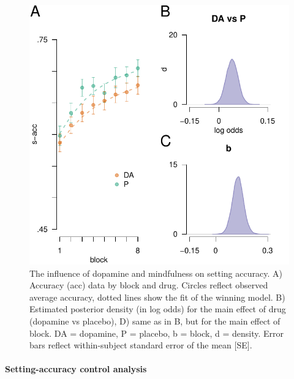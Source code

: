 \documentclass{article}
\begin{document}
\begin{figure}

{\centering \includegraphics[width=0.7\linewidth]{../../images/cacc_fig} 

}

\caption{The influence of dopamine and mindfulness on setting accuracy. A) Accuracy (acc) data by block and drug. Circles reflect observed average accuracy, dotted lines show the fit of the winning model. B) Estimated posterior density (in log odds) for the main effect of drug (dopamine vs placebo), D) same as in B, but for the main effect of block. DA = dopamine, P = placebo, b = block, d = density. Error bars reflect within-subject standard error of the mean [SE].}\label{fig:caccfig}
\end{figure}

\hypertarget{setting-accuracy-control-analysis}{%
\paragraph{Setting-accuracy control
analysis}\label{setting-accuracy-control-analysis}}
\end{document}
